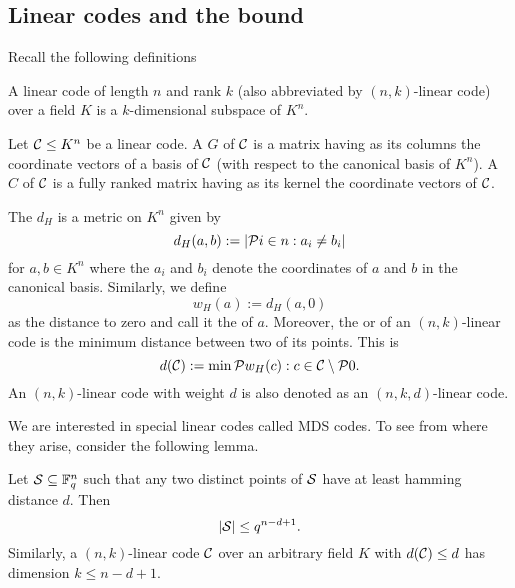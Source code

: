 \subsection{Linear codes and the  bound}

Recall the following definitions

\begin{definition}
    A linear code of length $n$ and rank $k$ (also abbreviated by $(n,k)$-linear code) over a field $K$ is a $k$-dimensional subspace of $K^n$.  
\end{definition}

\begin{definition}
    Let $\mathcal{C}\leq K^n$ be a linear code. A  $G$ of $\mathcal{C}$ is a matrix having as its columns the coordinate vectors of a basis of $\mathcal{C}$ (with respect to the canonical basis of $K^n$). A  $C$ of $\mathcal{C}$ is a fully ranked matrix having as its kernel the coordinate vectors of $\mathcal{C}$.
\end{definition}

\begin{definition}
    The  $d_H$ is a metric on $K^n$ given by
    $$
    d_H(a,b):=\card{\set{i\in n:a_i\neq b_i}}
    $$
    for $a,b\in K^n$ where the $a_i$ and $b_i$ denote the coordinates of $a$ and $b$ in the canonical basis.
    Similarly, we define
    $$
    w_H(a):=d_H(a,0)
    $$
    as the  distance to zero and call it the  of $a$.
    Moreover, the  or  of an $(n,k)$-linear code is the minimum  distance between two of its points.
    This is
    $$
    d(\cC):=\min\set{w_H(c):c\in\cC\setminus\set{0}}.
    $$
    An $(n,k)$-linear code with  weight $d$ is also denoted as an $(n,k,d)$-linear code.
\end{definition}

We are interested in special linear codes called MDS codes. To see from where they arise, consider the following lemma.

\begin{lemma}
    Let $\mathcal{S}\subseteq \mathbb{F}_{q}^n$ such that any two distinct points of $\mathcal{S}$ have at least hamming distance $d$. Then
    $$
    \left|\mathcal{S}\right|\leq q^{n-d+1}.
    $$
    Similarly, a $(n,k)$-linear code $\mathcal{C}$ over an arbitrary field $K$ with $d(\mathcal{C})\leq d$ has dimension $k\leq n-d+1$.
\end{lemma}

